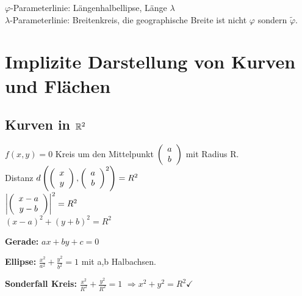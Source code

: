 $\varphi$-Parameterlinie: Längenhalbellipse, Länge $\lambda$\\
$\lambda$-Parameterlinie: Breitenkreis, die geographische Breite ist nicht $\varphi$ sondern $\tilde{\varphi}$.

\section{Implizite Darstellung von Kurven und Flächen}

\subsection{Kurven in $\mathbb{R}^2$}
$f(x,y) = 0$ Kreis um den Mittelpunkt $  \left(  \begin{array}{c} a\\b \end{array}  \right)  $ mit Radius R. \\
Distanz $d \left(   \left(  \begin{array}{c} x\\y \end{array}  \right)  ,  \left(  \begin{array}{c} a\\b \end{array}  \right)  ^2 \right)  = R^2$\\
$ \left\vert   \left(  \begin{array}{c} x-a\\y-b \end{array}  \right)   \right\vert ^2 = R^2$\\
$(x-a)^2 + (y+b)^2 = R^2$

\textbf{Gerade:} $ax+by+c = 0$

\textbf{Ellipse:} $\frac{x^2}{a^2} + \frac{y^2}{b^2} = 1$ mit a,b Halbachsen. 

\textbf{Sonderfall Kreis:} $\frac{x^2}{R^2} + \frac{y^2}{R^2} = 1$
$\Rightarrow x^2+y^2=R^2 \checkmark$


